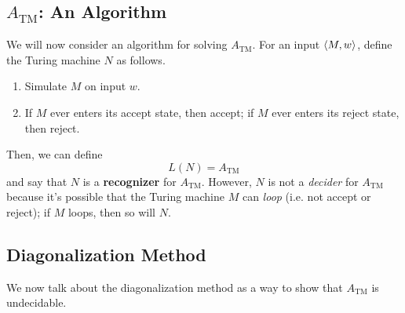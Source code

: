 \documentclass[letterpaper]{article}
\begin{document}
\subsection{\texorpdfstring{$A_{\text{TM}}$}{Checking if TM Accepts String}: An Algorithm}
We will now consider an algorithm for solving $A_{\text{TM}}$. For an input $\langle M, w \rangle$, define the Turing machine $N$ as follows.
\begin{enumerate}
    \item Simulate $M$ on input $w$. 
    \item If $M$ ever enters its accept state, then accept; if $M$ ever enters its reject state, then reject.
\end{enumerate}
Then, we can define
\[L(N) = A_{\text{TM}}\]
and say that $N$ is a \textbf{recognizer} for $A_{\text{TM}}$. However, $N$ is not a \emph{decider} for $A_{\text{TM}}$ because it's possible that the Turing machine $M$ can \emph{loop} (i.e. not accept or reject); if $M$ loops, then so will $N$.

\subsection{Diagonalization Method}
We now talk about the diagonalization method as a way to show that $A_{\text{TM}}$ is undecidable.
\end{document}
